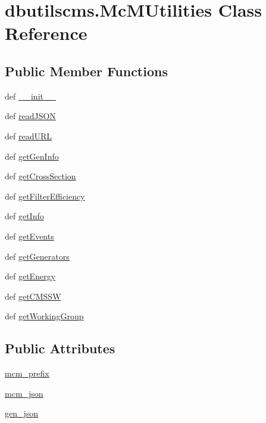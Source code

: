 \section{dbutilscms.\-Mc\-M\-Utilities Class Reference}
\label{classdbutilscms_1_1McMUtilities}
\subsection*{Public Member Functions}
\begin{DoxyCompactItemize}
\item 
def \hyperlink{classdbutilscms_1_1McMUtilities_ae74ca46c7da084dd4e299e8137f19513}{\-\_\-\-\_\-init\-\_\-\-\_\-}
\item 
def \hyperlink{classdbutilscms_1_1McMUtilities_a87e28ac2a929b2472668f3167163e5c2}{read\-J\-S\-O\-N}
\item 
def \hyperlink{classdbutilscms_1_1McMUtilities_ab132e26679ab05fe6350f25fa574249d}{read\-U\-R\-L}
\item 
def \hyperlink{classdbutilscms_1_1McMUtilities_aaa895c639f3c18c3c5b985297bd397f2}{get\-Gen\-Info}
\item 
def \hyperlink{classdbutilscms_1_1McMUtilities_ab338d6e35d141a81ea4f6ff0bdfdac7d}{get\-Cross\-Section}
\item 
def \hyperlink{classdbutilscms_1_1McMUtilities_a0e0dc4794541767ea4362b670af7f092}{get\-Filter\-Efficiency}
\item 
def \hyperlink{classdbutilscms_1_1McMUtilities_a04717648cc2569413e9b0fda0e58dc88}{get\-Info}
\item 
def \hyperlink{classdbutilscms_1_1McMUtilities_a1076745891a371b89c26be43ccc43633}{get\-Events}
\item 
def \hyperlink{classdbutilscms_1_1McMUtilities_a02a129857b6b3997779a4f99ea4b03f7}{get\-Generators}
\item 
def \hyperlink{classdbutilscms_1_1McMUtilities_a2dc62cb225e2e5af0b6ea91f95dfb5e9}{get\-Energy}
\item 
def \hyperlink{classdbutilscms_1_1McMUtilities_ac09855cc37dcc2ed9f9e8510d9b2a4fc}{get\-C\-M\-S\-S\-W}
\item 
def \hyperlink{classdbutilscms_1_1McMUtilities_a375c736eaa090f94f2b90bb05db44b34}{get\-Working\-Group}
\end{DoxyCompactItemize}
\subsection*{Public Attributes}
\begin{DoxyCompactItemize}
\item 
\hyperlink{classdbutilscms_1_1McMUtilities_a747bf77793d263466e34c3adb7aaa41f}{mcm\-\_\-prefix}
\item 
\hyperlink{classdbutilscms_1_1McMUtilities_a74cae1d5e5f10e8e02d6ab01c4685df7}{mcm\-\_\-json}
\item 
\hyperlink{classdbutilscms_1_1McMUtilities_a76183411bde06b86c5f069debe9de0cb}{gen\-\_\-json}
\end{DoxyCompactItemize}


